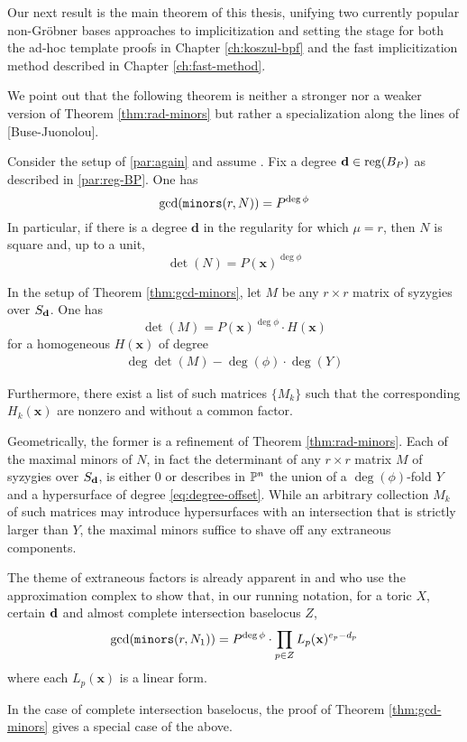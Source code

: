 \documentclass[fleqn,reqno]{amsart}
\numberwithin{first}{chapter}
\begin{document}
\begin{paragraf*}
Our next result is the main theorem of this thesis, unifying two currently
popular non-Gr\"{o}bner bases approaches to implicitization and setting the stage for both
the ad-hoc template proofs in Chapter \ref{ch:koszul-bpf} and
the fast implicitization method described in Chapter \ref{ch:fast-method}.

We point out that the following theorem is neither a stronger nor a weaker version
of Theorem \ref{thm:rad-minors} but rather a specialization along the lines of [Buse-Juonolou].
\end{paragraf*}

\begin{theorem}
\label{thm:gcd-minors}
Consider the setup of \eqref{par:again} and assume .
Fix a degree $\mathbf d\in\operatorname{reg}(B_P)$ as described in \eqref{par:reg-BP}.
One has
\[
\gcd(\mathop{\tt minors}(r, N))=P^{\deg\phi}
\]
In particular, if there is a degree $\mathbf d$ in the regularity for which $\mu=r$,
then $N$ is square and, up to a unit,
\[
\det(N)=P(\mathbf x)^{\deg\phi}
\]
\end{theorem}

\begin{corollary}
\label{thm:detM}
In the setup of Theorem \ref{thm:gcd-minors},
let $M$ be any $r\times r$ matrix of syzygies over $S_\mathbf d$. One has
\[
	\det(M)=P(\mathbf x)^{\deg\phi}\cdot H(\mathbf x)
\]
for a homogeneous $H(\mathbf x)$ of degree
\begin{align}
\label{eq:degree-offset}
\deg\det(M)-\deg(\phi)\cdot\deg(Y)
\end{align}

Furthermore, there exist a list of such matrices $\{M_k\}$ such that
the corresponding $H_k(\mathbf x)$ are nonzero and without a common factor.
\end{corollary}

\begin{paragraf*}
Geometrically, the former is a refinement of Theorem \ref{thm:rad-minors}.
Each of the maximal minors of $N$, in fact
the determinant of any $r\times r$ matrix $M$ of syzygies over $S_\mathbf d$, is either $0$
or describes in $\mathbb{P}^n$ the union of a $\deg(\phi)$-fold $Y$ and
a hypersurface of degree \eqref{eq:degree-offset}.
While an arbitrary collection $M_k$ of such matrices may introduce hypersurfaces
with an intersection that is strictly larger than $Y$,
the maximal minors suffice to shave off any extraneous components.

The theme of extraneous factors is already apparent in \citet{BCJ09} and \citet{Botbol2011}
who use the approximation complex to show that, in our running notation, for a toric $X$,
certain $\mathbf d$ and almost complete intersection baselocus $Z$,
\[
	\gcd(\mathop{\tt minors}(r,N_1))=P^{\deg\phi}\cdot\prod_{p\in Z} L_p(\mathbf x)^{e_p-d_p}
\]
where each $L_p(\mathbf x)$ is a linear form.

In the case of complete intersection baselocus, the proof of Theorem \ref{thm:gcd-minors}
gives a special case of the above.
\end{paragraf*}
\end{document}
